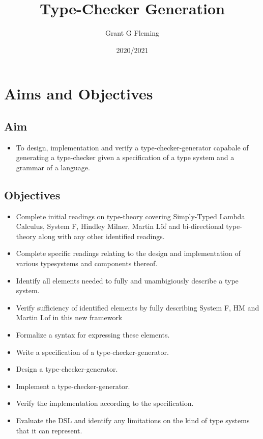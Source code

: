 \documentclass{ProgressReport}[2020/09/15]
\title{Type-Checker Generation}
\author{Grant G Fleming}
\date{2020/2021}
\begin{document}
	\maketitle
	\tableofcontents
        
        \chapter{Aims and Objectives}

        \section{Aim}

        \begin{itemize}
          \item To design, implementation and verify a
            type-checker-generator capabale of generating a
            type-checker given a specification of a type system and a
            grammar of a language. 
        \end{itemize}
        
        \section{Objectives}

        \begin{itemize}
          \item Complete initial readings on type-theory covering
            Simply-Typed Lambda Calculus, System F, Hindley Milner,
            Martin L\"{o}f and bi-directional type-theory along with
            any other identified readings.
          \item Complete specific readings relating to the design and
            implementation of various typesystems and components thereof.
          \item Identify all elements needed to fully and
            unambigiously describe a type system.
          \item Verify sufficiency of identified elements by fully describing
            System F, HM and Martin Lof in this new framework
          \item Formalize a syntax for expressing these elements.
          \item Write a specification of a type-checker-generator.
          \item Design a type-checker-generator.
          \item Implement a type-checker-generator.
          \item Verify the implementation according to the
            specification.
          \item Evaluate the DSL and identify any limitations on the
            kind of type systems that it can represent.
        \end{itemize}
        
\end{document}
